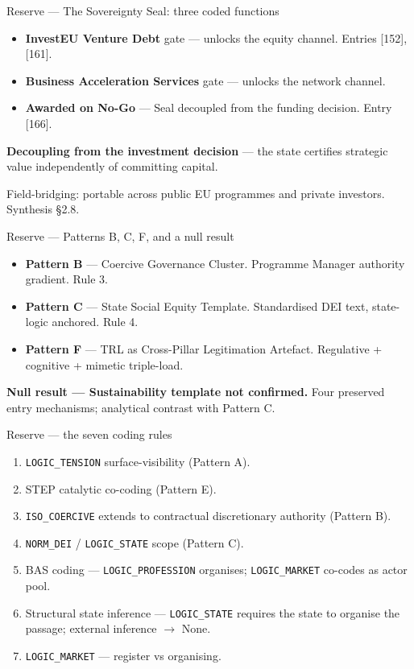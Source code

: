 \documentclass[aspectratio=169,hyperref={pdfpagelabels=false}]{beamer}
\begin{document}
\begin{frame}{Reserve — The Sovereignty Seal: three coded functions}
    \begin{itemize}
        \item \textbf{InvestEU Venture Debt} gate — unlocks the equity channel. Entries [152], [161].
        \item \textbf{Business Acceleration Services} gate — unlocks the network channel.
        \item \textbf{Awarded on No-Go} — Seal decoupled from the funding decision. Entry [166].
    \end{itemize}
    \vspace{4mm}
    \textbf{Decoupling from the investment decision} — the state certifies strategic value independently of committing capital.

    \vspace{3mm}
    Field-bridging: portable across public EU programmes and private investors. Synthesis §2.8.
\end{frame}

\begin{frame}{Reserve — Patterns B, C, F, and a null result}
    \begin{itemize}
        \item \textbf{Pattern B} — Coercive Governance Cluster. Programme Manager authority gradient. Rule 3.
        \item \textbf{Pattern C} — State Social Equity Template. Standardised DEI text, state-logic anchored. Rule 4.
        \item \textbf{Pattern F} — TRL as Cross-Pillar Legitimation Artefact. Regulative + cognitive + mimetic triple-load.
    \end{itemize}
    \vspace{3mm}
    \textbf{Null result — Sustainability template not confirmed.} Four preserved entry mechanisms; analytical contrast with Pattern C.
\end{frame}

\begin{frame}{Reserve — the seven coding rules}
    \begin{enumerate}
        \item \texttt{LOGIC\_TENSION} surface-visibility (Pattern A).
        \item STEP catalytic co-coding (Pattern E).
        \item \texttt{ISO\_COERCIVE} extends to contractual discretionary authority (Pattern B).
        \item \texttt{NORM\_DEI} / \texttt{LOGIC\_STATE} scope (Pattern C).
        \item BAS coding — \texttt{LOGIC\_PROFESSION} organises; \texttt{LOGIC\_MARKET} co-codes as actor pool.
        \item Structural state inference — \texttt{LOGIC\_STATE} requires the state to organise the passage; external inference $\to$ None.
        \item \texttt{LOGIC\_MARKET} — register vs organising.
    \end{enumerate}
\end{frame}
\end{document}
